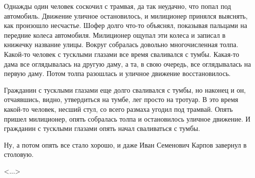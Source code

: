 Однажды один человек соскочил с трамвая, да так неудачно, что попал под автомобиль. Движение уличное остановилось, и милиционер принялся выяснять, как произошло несчастье. Шофер долго что-то объяснял, показывая пальцами на передние колеса автомобиля. Милиционер ощупал эти колеса и записал в книжечку название улицы. Вокруг собралась довольно многочисленная толпа. Какой-то человек с тусклыми глазами все время сваливался с тумбы. Какая-то дама все оглядывалась на другую даму, а та, в свою очередь, все оглядывалась на первую даму. Потом толпа разошлась и уличное движение восстановилось.

Гражданин с тусклыми глазами еще долго сваливался с тумбы, но наконец и он, отчаявшись, видно, утвердиться на тумбе, лег просто на тротуар. В это время какой-то человек, несший стул, со всего размаха угодил под трамвай. Опять пришел милиционер, опять собралась толпа и остановилось уличное движение. И гражданин с тусклыми глазами опять начал сваливаться с тумбы.

Ну, а потом опять все стало хорошо, и даже Иван Семенович Карпов завернул в столовую.

\vspace{1em}
\hfill <...>